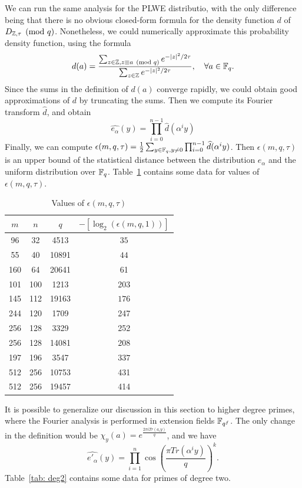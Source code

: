 \documentclass{amsart}
\begin{document}
We can run the same analysis for the PLWE distributio, with the only difference being that there is no obvious closed-form formula for the density function $d$  of $D_{\mathbb{Z},\tau} \pmod{q}$. Nonetheless, we could numerically approximate this probability density function, using the formula
\[
  d(a)  = \frac{\sum_{z \in \mathbb{Z}, z \equiv a\pmod{q}} e^{-|z|^2/2\tau}}{\sum_{z \in \mathbb{Z}} e^{-|z|^2/2\tau}}, \quad \forall a \in \mathbb{F}_q.
\]
Since the sums in the definition of $d(a)$ converge rapidly, we could obtain good approximations of $d$ by truncating the sums. Then we compute its Fourier transform $\hat{d}$, and obtain
\[
    \widehat{e_\alpha}(y) = \prod_{i=0}^{n-1} \hat{d}(\alpha^i y)
\]
Finally, we can compute $\epsilon(m,q,\tau) = \frac{1}{2} \sum_{y \in \mathbb{F}_q, y \neq 0} \prod_{i=0}^{n-1} \widehat{d}(\alpha^i y)$. Then $\epsilon(m,q,\tau)$ is an upper bound of the statistical distance  between the distribution $e_\alpha$ and the uniform distribution over $\mathbb{F}_q$. Table~\ref{table: deg2} contains some data for values of $\epsilon(m,q,\tau)$.



\FloatBarrier
\begin{table}[H]
\label{table: deg2}
\caption{Values of $\epsilon(m,q,\tau)$}
\begin{tabular}{c|c|c|c}
$m$ & $n$ & $q$ &  $-[\log_2(\epsilon(m,q, 1))]$ \\
\hline
96 & 32 & 4513 & $35$ \\
55 & 40 & 10891  & $44$ \\
160 & 64 &20641 & 61 \\
101 & 100 & 1213 & 203 \\
145 & 112  &19163 & $176$ \\
244 & 120 & 1709 & 247 \\
256 & 128 & 3329 & 252\\
256 & 128 & 14081 & $208$ \\
197 & 196 & 3547 & $337$ \\
512 & 256 &10753 & 431 \\
512 & 256 &19457 & 414
\end{tabular}
\end{table}


\begin{remark}
It is possible to generalize our discussion in this section to higher degree primes, where the Fourier analysis is performed in extension fields $\mathbb{F}_{q^f}$. The only change in the definition would be $\chi_y(a) = e^{ \frac{2 \pi i Tr(a_i y)}{q}}$, and we have
\[
    \widehat{e'_\alpha}(y) = \prod_{i=1}^{n} \cos \left(\frac{ \pi Tr(\alpha^i y) }{q} \right)^k.
\]
Table~\ref{tab: deg2} contains some data for primes of degree two.
\end{remark}
\end{document}
